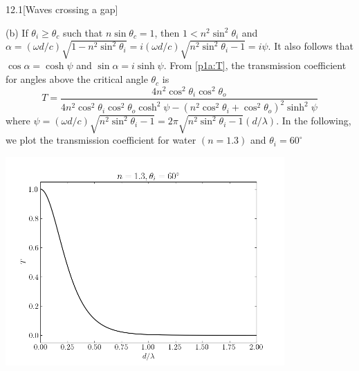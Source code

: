 \documentclass[12pt]{article}
\begin{document}
\begin{problem}{12.1}[Waves crossing a gap]
\begin{solution}
(b) If $\theta_i\geq \theta_c$ such that $n\sin\theta_c=1$, then
$1<n^2\sin^2\theta_i$ and $\alpha=(\omega
d/c)\sqrt{1-n^2\sin^2\theta_i}=i(\omega d/c)\sqrt{n^2\sin^2\theta_i-1}=i\psi$.
It also follows that $\cos\alpha=\cosh\psi$ and $\sin\alpha=i\sinh\psi$. From
\eqref{p1a:T}, the transmission coefficient for angles above the critical angle
$\theta_c$ is
\begin{equation}
    T=\frac{4n^2\cos^2\theta_i\cos^2\theta_o}{4n^2\cos^2\theta_i\cos^2\theta_o\cosh^2\psi-(n^2\cos^2\theta_i+\cos^2\theta_o)^2\sinh^2\psi}
\end{equation}
where $\psi=(\omega
d/c)\sqrt{n^2\sin^2\theta_i-1}=2\pi\sqrt{n^2\sin^2\theta_i-1}(d/\lambda)$. In 
the following, we plot the transmission coefficient for water $(n=1.3)$ and
$\theta_i=60^\circ$
\begin{center}
    \includegraphics[width=0.8\textwidth]{p1.png} 
\end{center}
\end{solution}
\end{problem}
\end{document}
